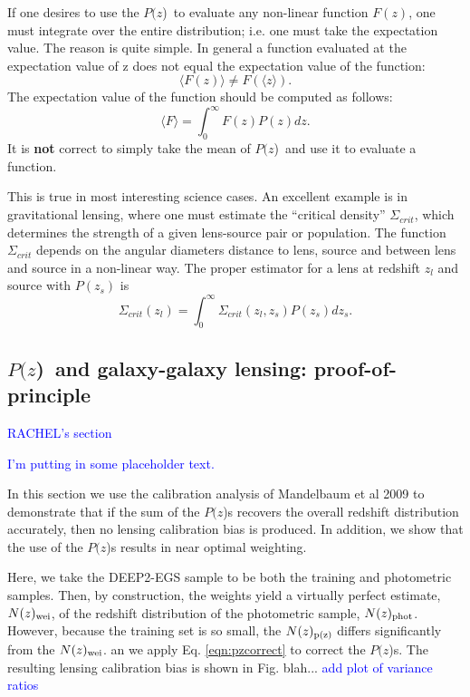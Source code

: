 \documentclass[preprint]{aastex}
\newcommand{\pofz}{$P(z$)}
\newcommand{\nwei}{N(z)_{\rm wei}}
\newcommand{\npz}{N(z)_{\rm p(z)}}
\newcommand{\nphot}{N(z)_{\rm phot}}
\begin{document}
If one desires to use the \pofz\ to evaluate any non-linear function $F(z)$,
one must integrate over the entire distribution; i.e. one must take the
expectation value.  The reason is quite simple. In general a function evaluated
at the expectation value of z does not equal the expectation value of the
function:
\begin{equation}
\langle F(z) \rangle \ne F(\langle z \rangle).
\end{equation}
The expectation value of the function should be computed as follows:
\begin{equation}
\langle F \rangle = \int_{0}^{\infty} F(z) P(z) dz.
\end{equation}
It is {\bf not} correct to simply take the mean of \pofz\ and use it to evaluate
a function.

This is true in most interesting science cases.  An excellent example is in
gravitational lensing, where one must estimate the ``critical density''
$\Sigma_{crit}$, which determines the strength of a given lens-source pair or
population.  The function $\Sigma_{crit}$ depends on the angular diameters
distance to lens, source and between lens and source in a non-linear way.  The
proper estimator for a lens at redshift $z_{l}$ and source with $P(z_s)$ is
\begin{equation}
\Sigma_{crit}(z_l) = \int_{0}^{\infty} \Sigma_{crit}(z_l, z_s) P(z_s) dz_s.
\end{equation}



\subsection{\pofz\ and galaxy-galaxy lensing: proof-of-principle} \label{sec:pofp}

\textcolor{blue}{RACHEL's section}

\textcolor{blue}{I'm putting in some placeholder text.}


In this section we use the calibration analysis of Mandelbaum et al 2009 to 
demonstrate that if the sum of the \pofz s recovers the overall redshift distribution
accurately, then no lensing calibration bias is produced.
In addition, we show that the use of the \pofz s results in near optimal weighting.




Here, we take the DEEP2-EGS sample to be both the training and photometric samples. 
Then, by construction, the weights yield a virtually perfect estimate, $\nwei$, of the 
redshift distribution of the photometric sample, $\nphot$.
However, because the training set is so small, the $\npz$ differs significantly from the $\nwei$.
an we apply Eq. \ref{eqn:pzcorrect} to correct the \pofz s. 
The resulting lensing calibration bias is shown in Fig. blah...
\textcolor{blue}{add plot of variance ratios} 
\end{document}
